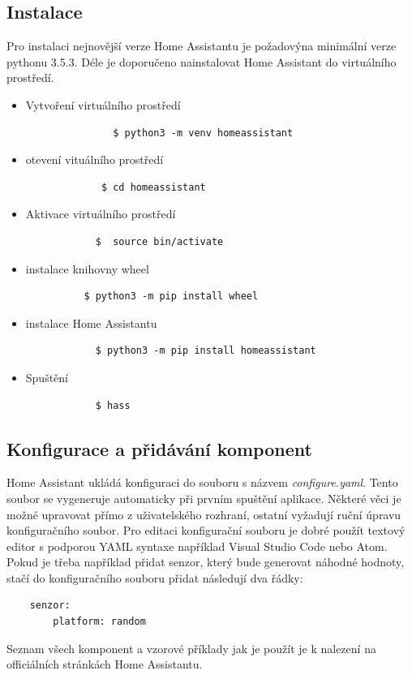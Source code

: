 \documentclass[a4paper,12pt,czech,bibliography=totoc]{scrbook}
\begin{document}
	\subsection{Instalace}
	Pro instalaci nejnovější verze Home Assistantu je požadovýna minimální verze pythonu 3.5.3. Déle je doporučeno nainstalovat Home Assistant do virtuálního prostředí.
	\begin{itemize}
		\item Vytvoření virtuálního prostředí
			\begin{lstlisting}
			   $ python3 -m venv homeassistant
			\end{lstlisting}
		\item otevení vituálního prostředí
		 	\begin{lstlisting}
		     $ cd homeassistant
		  \end{lstlisting}
		\item Aktivace virtuálního prostředí
			\begin{lstlisting}
	   		$  source bin/activate
		  \end{lstlisting}
		\item instalace knihovny wheel
		\begin{lstlisting}
		  $ python3 -m pip install wheel
		\end{lstlisting}
		\item instalace Home Assistantu
			\begin{lstlisting}
	    	$ python3 -m pip install homeassistant
		\end{lstlisting}
		\item Spuštění
		\begin{lstlisting}
	    	$ hass
		\end{lstlisting}
	\end{itemize}
	\subsection{Konfigurace a přidávání komponent}
	Home Assistant ukládá konfiguraci do souboru s názvem \textit{configure.yaml}. Tento soubor se vygeneruje automaticky při prvním spuštění aplikace. Některé věci je možné upravovat přímo z uživatelského rozhraní, ostatní vyžadují ruční úpravu konfiguračního soubor. Pro editaci konfigurační souboru je dobré použít textový editor s podporou YAML syntaxe například Visual Studio Code nebo Atom.
	Pokud je třeba například přidat senzor, který bude generovat náhodné hodnoty, stačí do konfiguračního souboru přidat následují dva řádky:
		\begin{lstlisting}
	senzor:
	    platform: random
	\end{lstlisting}
	Seznam všech komponent a vzorové příklady jak je použít je k nalezení na officiálních stránkách Home Assistantu.
		
\end{document}
